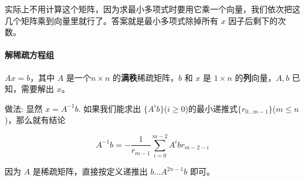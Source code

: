 	实际上不用计算这个矩阵，因为求最小多项式时要用它乘一个向量，我们依次把这几个矩阵乘到向量里就行了。答案就是最小多项式除掉所有 $x$ 因子后剩下的次数。

\paragraph*{解稀疏方程组}

	$Ax = b$，其中 $A$ 是一个$n \times n$ 的\textbf{满秩}稀疏矩阵，$b$ 和 $x$ 是 $1\times n$ 的\textbf{列}向量，$A, b$ 已知，需要解出 $x$。

	做法: 显然 $x = A^{-1} b$. 如果我们能求出 $\{A^i b\}$($i \ge 0$)的最小递推式$\{r_{0 \dots m - 1}\}$($m \le n$)，那么就有结论

	$$ A^{-1} b = -\frac 1 {r_{m - 1}} \sum_{i = 0} ^ {m - 2} A^i b r_{m - 2 - i} $$

	因为 $A$ 是稀疏矩阵，直接按定义递推出 $b \dots A^{2n - 1} b$ 即可。
	
	\inputminted{cpp}{src/Math/解稀疏方程组.cpp}
